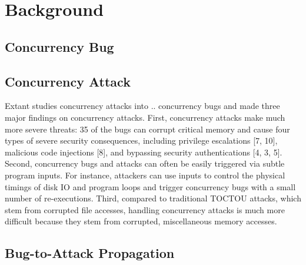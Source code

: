 \section{Background}\label{sec:background}

\subsection{Concurrency Bug}

\subsection{Concurrency Attack}
Extant studies \cite{con:hotpar12, acidrain:sigmod17}  concurrency 
attacks into .. 
concurrency bugs and made three major findings on concurrency
attacks. First, concurrency attacks make much more severe threats:
35 of the bugs can corrupt critical memory and cause four
types of severe security consequences, including privilege escalations [7, 10],
malicious code injections [8], and bypassing security authentications
[4, 3, 5].
Second, concurrency bugs and attacks can often be easily
triggered via subtle program inputs. For instance, attackers
can use inputs to control the physical timings of disk
IO and program loops and trigger concurrency bugs with a
small number of re-executions. Third, compared to traditional
TOCTOU attacks, which stem from corrupted file accesses,
handling concurrency attacks is much more difficult because
they stem from corrupted, miscellaneous memory accesses.


\subsection{Bug-to-Attack Propagation}





